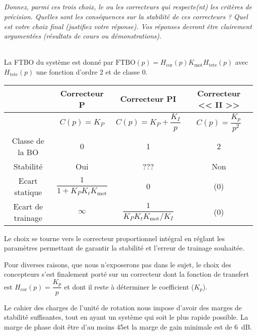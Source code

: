 \subparagraph{\label{q_12}}\textit{Donnez, parmi ces trois choix, le ou les correcteurs qui respecte(nt) les critères de précision.
Quelles sont les conséquences sur la stabilité de ces correcteurs ?
Quel est votre choix final (justifiez votre réponse).
Vos réponses devront être clairement argumentées (résultats de cours ou démonstrations).}
\ifprof
\begin{corrige} ~\\

La FTBO du système est donné par $\text{FTBO}(p)=H_{\text{cor}}(p)K_{\text{mot}}H_{\text{tete}}(p)$ avec 
$H_{\text{tete}}(p)$ une fonction d'ordre 2 et de classe 0. 

\begin{center}
\begin{tabular}{cccc}
\hline
& Correcteur P & Correcteur PI & Correcteur << II >> \\\hline
& $C(p)=K_P$    & $C(p)=K_P + \dfrac{K_I}{p}$ & $C(p)= \dfrac{K_p}{p^2}$  \\  \hline
Classe de la BO & 0 & 1 & 2 \\\hline
Stabilité  & Oui & ??? & Non \\\hline
Ecart statique & $\dfrac{1}{1+K_PK_tK_{\text{mot}}}$ & 0 & (0)\\\hline
Ecart de trainage & $\infty$ & $\dfrac{1}{K_PK_tK_{\text{mot}}/K_I}$ & (0)\\\hline
\end{tabular}
\end{center}
Le choix se tourne vers le correcteur proportionnel intégral en réglant les paramètres permettant de garantir la stabilité et l'erreur de trainage souhaitée. 
\end{corrige}
\else
\fi


Pour diverses raisons, que nous n’exposerons pas dans le sujet, le choix des concepteurs s’est finalement
porté sur un correcteur dont la fonction de transfert est 
$H_{\text{cor}}(p) = \dfrac{K_p}{p}$ et dont il reste à déterminer le
coefficient ($K_p$).


Le cahier des charges de l’unité de rotation nous impose d’avoir des marges de stabilité suffisantes, tout en
ayant un système qui soit le plus rapide possible. La marge de phase doit être d’au moins 45\degres et la marge
de gain minimale est de \SI{6}{dB}.

